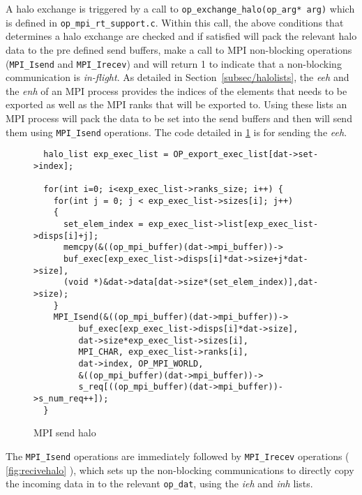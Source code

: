 \documentclass[11pt]{article}
\begin{document}
\noindent A halo exchange is triggered by a call to \texttt{op\_exchange\_halo(op\_arg* arg)} which is defined in
\texttt{op\_mpi\_rt\_support.c}. Within this call, the above conditions that determines a halo exchange are
checked and if satisfied will pack the relevant halo data to the pre defined send buffers, make a call to MPI
non-blocking operations (\texttt{MPI\_Isend} and \texttt{MPI\_Irecev}) and will return 1 to indicate that a non-blocking
communication is \textit{in-flight}. As detailed in Section~\ref{subsec/halolists}, the \textit{eeh} and the
\textit{enh} of an MPI process provides the indices of the elements that needs to be exported as well as the MPI ranks
that will be exported to. Using these lists an MPI process will pack the data to be set into the send buffers and then
will send them using \texttt{MPI\_Isend} operations. The code detailed in \figurename{ \ref{fig:sendhalo}} is
for sending the \textit{eeh}.\\

\begin{figure}[t]\small
\begin{verbatim}
  halo_list exp_exec_list = OP_export_exec_list[dat->set->index];

  for(int i=0; i<exp_exec_list->ranks_size; i++) {
    for(int j = 0; j < exp_exec_list->sizes[i]; j++)
    {
      set_elem_index = exp_exec_list->list[exp_exec_list->disps[i]+j];
      memcpy(&((op_mpi_buffer)(dat->mpi_buffer))->
      buf_exec[exp_exec_list->disps[i]*dat->size+j*dat->size],
      (void *)&dat->data[dat->size*(set_elem_index)],dat->size);
    }
    MPI_Isend(&((op_mpi_buffer)(dat->mpi_buffer))->
         buf_exec[exp_exec_list->disps[i]*dat->size],
         dat->size*exp_exec_list->sizes[i],
         MPI_CHAR, exp_exec_list->ranks[i],
         dat->index, OP_MPI_WORLD,
         &((op_mpi_buffer)(dat->mpi_buffer))->
         s_req[((op_mpi_buffer)(dat->mpi_buffer))->s_num_req++]);
  }
\end{verbatim}
\caption{\small MPI send halo}
\normalsize\vspace{-0pt}\label{fig:sendhalo}
\end{figure}

\noindent The \texttt{MPI\_Isend} operations are immediately followed by \texttt{MPI\_Irecev} operations (\figurename{
\ref{fig:recivehalo}} ), which sets up the non-blocking communications to directly copy the incoming data in to the
relevant \texttt{op\_dat}, using the \textit{ieh} and \textit{inh} lists.\\
\end{document}
